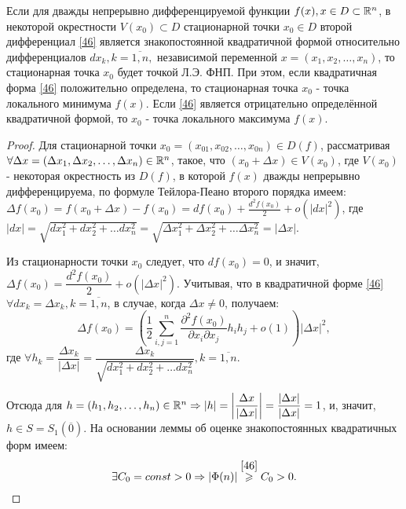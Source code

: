 \begin{theorem}
	Если для дважды непрерывно дифференцируемой функции $f(x), x \in D \subset \mathbb{R}^n$, в некоторой окрестности $V(x_0) \subset D$ стационарной точки $x_0 \in D$ второй дифференциал \eqref{46} является знакопостоянной квадратичной формой относительно дифференциалов $d x_k, k = \overline{1,n},$ независимой переменной $x = (x_1, x_2, \ldots, x_n)$, то стационарная точка $x_0$ будет точкой Л.Э. ФНП. При этом, если квадратичная форма \eqref{46} положительно определена, то стационарная точка $x_0$ - точка локального минимума $f(x)$. Если \eqref{46} является отрицательно определённой квадратичной формой, то $x_0$ - точка локального максимума $f(x)$.
\end{theorem}
\begin{proof}
	Для стационарной точки $x_0 = (x_{01}, x_{02}, \ldots, x_{0n}) \in D(f)$, рассматривая $\forall \Delta x = (\Delta x_1, \Delta x_2, \ldots, \Delta x_n) \in \mathbb{R}^n$, такое, что $(x_0 + \Delta x) \in V(x_0)$, где $V(x_0)$ - некоторая окрестность из $D(f)$, в которой $f(x)$ дважды непрерывно дифференцируема, по формуле Тейлора-Пеано второго порядка имеем: $\Delta f(x_0) = f(x_0 + \Delta x) - f(x_0) = df(x_0) + \frac{d^2 f(x_0)}{2} + o(|dx|^2)$, где $|dx| = \sqrt{dx_1^2 + dx_2^2 + \ldots dx_n^2} = \sqrt{\Delta x_1^2 + \Delta  x_2^2 + \ldots \Delta  x_n^2} = |\Delta x|$.

	Из стационарности точки $x_0$ следует, что $df(x_0) = 0$, и значит,  $\Delta f(x_0) = \dfrac{d^2 f(x_0)}{2}  + o(|\Delta x|^2)$. Учитывая, что в квадратичной форме \eqref{46} $\forall d x_k = \Delta x_k, k = \overline{1,n}$, в случае, когда $\Delta x \ne 0$, получаем:
	\begin{equation}
	\label{47}
	\Delta f(x_0) = \left( \dfrac{1}{2} \sum\limits_{i,j=1}^{n} \dfrac{\partial^2 f(x_0)}{\partial x_i \partial x_j} h_i h_j + o(1) \right) |\Delta x|^2,
	\end{equation}
	где $\forall h_k  = \dfrac{\Delta x_k}{|\Delta x|} = \dfrac{\Delta x_k}{\sqrt{dx_1^2 + dx_2^2 + \ldots dx_n^2}}, k = \overline{1,n}$.

    \newpage

	Отсюда для $h = (h_1, h_2, \ldots, h_n) \in \mathbb{R}^n \Rightarrow |h| = \left\lvert \dfrac{\Delta x}{|\Delta x|} \right\rvert = \dfrac{|\Delta x|}{|\Delta x|} = 1$, и, значит, $h \in S = S_1 (\overline{0})$. На основании леммы об оценке знакопостоянных квадратичных форм имеем:
    \begin{equation*}
        \exists C_0 = const > 0 \Rightarrow \left\lvert  \Phi(n)  \right\rvert \overset{\eqref{46}}{\geqslant} C_0  > 0.
    \end{equation*}


\end{proof}

